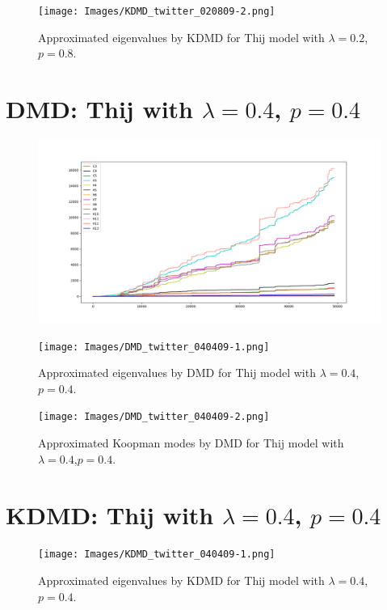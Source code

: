 \begin{figure}
    \texttt{[image: Images/KDMD\_twitter\_020809-2.png]}
    \centering
    \caption{Approximated eigenvalues by KDMD for Thij model
    with $\lambda=0.2$,$p=0.8$.}
\end{figure}

\FloatBarrier

\section{DMD: Thij with $\lambda=0.4$, $p=0.4$}

\begin{figure}
    \includegraphics[width=12cm]{Images/twitter_counts_040409.png}
    \centering
\end{figure}

\begin{figure}
    \texttt{[image: Images/DMD\_twitter\_040409-1.png]}
    \centering
    \caption{Approximated eigenvalues by DMD for Thij model
    with $\lambda=0.4$,$p=0.4$.}
\end{figure}

\begin{figure}
    \texttt{[image: Images/DMD\_twitter\_040409-2.png]}
    \centering
    \caption{Approximated Koopman modes by DMD for Thij model
    with $\lambda=0.4$,$p=0.4$.}
\end{figure}
 

\clearpage

\section{KDMD: Thij with $\lambda=0.4$, $p=0.4$}

\begin{figure}
    \texttt{[image: Images/KDMD\_twitter\_040409-1.png]}
    \centering
    \caption{Approximated eigenvalues by KDMD for Thij model
    with $\lambda=0.4$,$p=0.4$.}
\end{figure}

